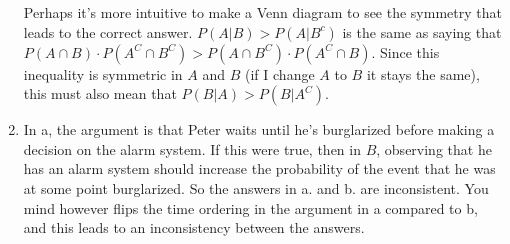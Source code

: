 \begin{exercise}[BH.2.14]
\begin{solution}
\begin{enumerate}
		Perhaps it's more intuitive to make a Venn diagram to see the symmetry that leads to the correct answer. $P(A|B)>P(A|B^c)$ is the same as saying that $P(A\cap B)\cdot P(A^{C}\cap  B^{C})>P(A\cap B^C)\cdot P(A^{C}\cap B)$.  Since this inequality is symmetric in $A$ and $B$ (if I change $A$ to $B$ it stays the same), this must also mean that $P(B|A)>P(B|A^{C})$.
		\item In a, the argument is that Peter waits until he's burglarized before making a decision on the alarm system. If this were true, then in $B$, observing that he has an alarm system should increase the probability of the event that he was at some point burglarized. So the answers in a. and b. are inconsistent. You mind however flips the time ordering in the argument in a compared to b, and this leads to an inconsistency between the answers.
	\end{enumerate}
\end{solution}
\end{exercise}

